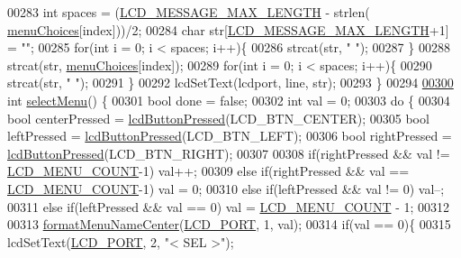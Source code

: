 \begin{DoxyCode}
00283     \textcolor{keywordtype}{int} spaces = (\hyperlink{lcdmsg_8h_abe4c4b70fc6f44ae3680e5b2c68cdd00}{LCD\_MESSAGE\_MAX\_LENGTH} - strlen(
      \hyperlink{lcddiag_8c_ab5b8edfc6a94520add858274b3fac974}{menuChoices}[index]))/2;
00284     \textcolor{keywordtype}{char} str[\hyperlink{lcdmsg_8h_abe4c4b70fc6f44ae3680e5b2c68cdd00}{LCD\_MESSAGE\_MAX\_LENGTH}+1] = \textcolor{stringliteral}{""};
00285     \textcolor{keywordflow}{for}(\textcolor{keywordtype}{int} i = 0; i < spaces; i++)\{
00286         strcat(str, \textcolor{stringliteral}{" "});
00287     \}
00288     strcat(str, \hyperlink{lcddiag_8c_ab5b8edfc6a94520add858274b3fac974}{menuChoices}[index]);
00289     \textcolor{keywordflow}{for}(\textcolor{keywordtype}{int} i = 0; i < spaces; i++)\{
00290         strcat(str, \textcolor{stringliteral}{" "});
00291     \}
00292     lcdSetText(lcdport, line, str);
00293 \}
00294 
\hypertarget{lcddiag_8c_source.tex_l00300}{}\hyperlink{lcddiag_8c_a1d2702d6508950416e4c927cc1ca18b3}{00300} \textcolor{keywordtype}{int} \hyperlink{lcddiag_8c_a1d2702d6508950416e4c927cc1ca18b3}{selectMenu}() \{
00301     \textcolor{keywordtype}{bool} done = \textcolor{keyword}{false};
00302     \textcolor{keywordtype}{int} val = 0;
00303     \textcolor{keywordflow}{do} \{
00304         \textcolor{keywordtype}{bool} centerPressed = \hyperlink{lcddiag_8h_a74e4c744db49f9b7b645095575e152ad}{lcdButtonPressed}(LCD\_BTN\_CENTER);
00305         \textcolor{keywordtype}{bool} leftPressed = \hyperlink{lcddiag_8h_a74e4c744db49f9b7b645095575e152ad}{lcdButtonPressed}(LCD\_BTN\_LEFT);
00306         \textcolor{keywordtype}{bool} rightPressed = \hyperlink{lcddiag_8h_a74e4c744db49f9b7b645095575e152ad}{lcdButtonPressed}(LCD\_BTN\_RIGHT);
00307 
00308         \textcolor{keywordflow}{if}(rightPressed && val != \hyperlink{lcddiag_8h_af08e03edfc50fa6a3af2555f9cce6e6c}{LCD\_MENU\_COUNT}-1) val++;
00309         \textcolor{keywordflow}{else} \textcolor{keywordflow}{if}(rightPressed && val == \hyperlink{lcddiag_8h_af08e03edfc50fa6a3af2555f9cce6e6c}{LCD\_MENU\_COUNT}-1) val = 0;
00310         \textcolor{keywordflow}{else} \textcolor{keywordflow}{if}(leftPressed && val != 0) val--;
00311         \textcolor{keywordflow}{else} \textcolor{keywordflow}{if}(leftPressed && val == 0) val = \hyperlink{lcddiag_8h_af08e03edfc50fa6a3af2555f9cce6e6c}{LCD\_MENU\_COUNT} - 1;
00312 
00313         \hyperlink{lcddiag_8c_a465a6cd66cde04199ae9641acce59d52}{formatMenuNameCenter}(\hyperlink{lcdmsg_8h_abcf42bd88b3c36193f301ca25b033875}{LCD\_PORT}, 1, val);
00314         \textcolor{keywordflow}{if}(val == 0)\{
00315             lcdSetText(\hyperlink{lcdmsg_8h_abcf42bd88b3c36193f301ca25b033875}{LCD\_PORT}, 2, \textcolor{stringliteral}{"<      SEL     >"});

\end{DoxyCode}
